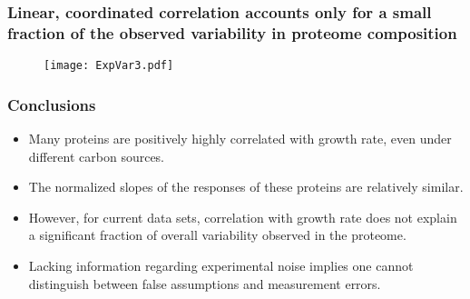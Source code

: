 \documentclass{beamer}
\begin{document}
\begin{frame}
\frametitle{Linear, coordinated correlation accounts only for a small fraction of the observed variability in proteome composition}
\begin{figure}[h!]
\centering
\texttt{[image: ExpVar3.pdf]}
\end{figure}
\end{frame}
\begin{frame}
\frametitle{Conclusions}
\begin{itemize}
\item Many proteins are positively highly correlated with growth rate, even under different carbon sources.
\item The normalized slopes of the responses of these proteins are relatively similar.
\item However, for current data sets, correlation with growth rate does not explain a significant fraction of overall variability observed in the proteome.
\item Lacking information regarding experimental noise implies one cannot distinguish between false assumptions and measurement errors.
\end{itemize}
\end{frame}
\end{document}
